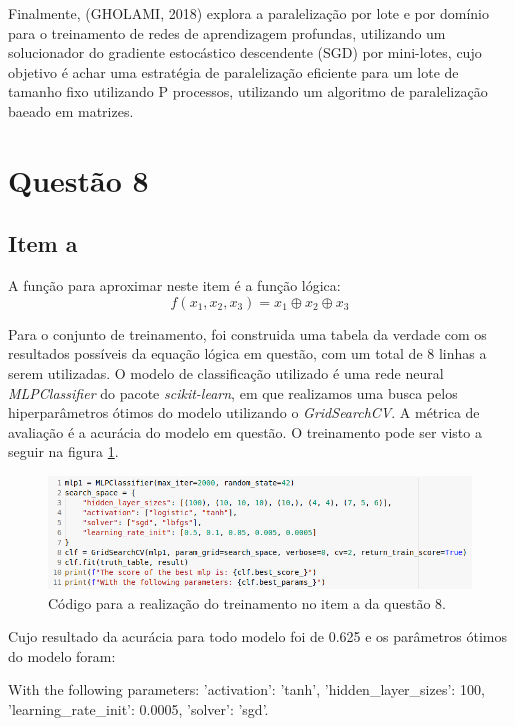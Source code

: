 \documentclass[a4paper, 12pt]{article}
\begin{document}
Finalmente, (GHOLAMI, 2018)\cite{gholami2018integrated} explora a paralelização por lote e por domínio para o treinamento de redes de aprendizagem profundas, utilizando um solucionador do gradiente estocástico descendente (SGD) por mini-lotes, cujo objetivo é achar uma estratégia de paralelização eficiente para um lote de tamanho fixo utilizando P processos, utilizando um algoritmo de paralelização baeado em matrizes. 

\section{Questão 8}

\subsection{Item a}
A função para aproximar neste item é a função lógica:
\begin{equation}
f(x_1, x_2, x_3) = x_1 \oplus x_2 \oplus x_3
\end{equation}

Para o conjunto de treinamento, foi construida uma tabela da verdade com os resultados possíveis da equação lógica em questão, com um total de 8 linhas a serem utilizadas. O modelo de classificação utilizado é uma rede neural \textit{MLPClassifier} do pacote \textit{scikit-learn}, em que realizamos uma busca pelos hiperparâmetros ótimos do modelo utilizando o \textit{GridSearchCV}. A métrica de avaliação é a acurácia do modelo em questão. O treinamento pode ser visto a seguir na figura \ref{fig:quest8a_code}.

\begin{figure}[h]
	\centering
 	\includegraphics[width=0.9\linewidth]{figuras/quest8a_code.png}
    \caption{Código para a realização do treinamento no item a da questão 8.}
    \label{fig:quest8a_code}
\end{figure}
\FloatBarrier

Cujo resultado da acurácia para todo modelo foi de 0.625 e os parâmetros ótimos do modelo foram: 

With the following parameters: {'activation': 'tanh', 'hidden\_layer\_sizes': 100, 'learning\_rate\_init': 0.0005, 'solver': 'sgd'}.
\end{document}
